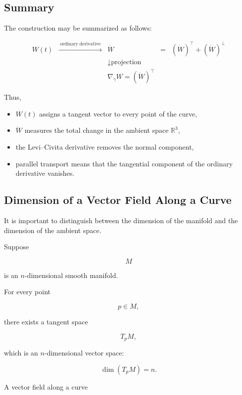 \documentclass[12pt,a4paper]{article}
\theoremstyle{notespace}
\begin{document}

\subsection{Summary}

The construction may be summarized as follows:

\[
\boxed{
	\begin{array}{ccccc}
		W(t)
		&\xrightarrow{\;\text{ordinary derivative}\;}
		&
		\dot W
		&=&
		(\dot W)^{\top}
		+
		(\dot W)^{\perp}
		\\[2mm]
		&&
		\downarrow
		\text{projection}
		&&
		\\[2mm]
		&&
		\nabla_{\dot\gamma}W
		=
		(\dot W)^{\top}
		&&
	\end{array}
}
\]

Thus,

\begin{itemize}
	\item \(W(t)\) assigns a tangent vector to every point of the curve,
	\item \(\dot W\) measures the total change in the ambient space
	\(\mathbb R^3\),
	\item the Levi--Civita derivative removes the normal component,
	\item parallel transport means that the tangential component of the
	ordinary derivative vanishes.
\end{itemize}

\subsection{Dimension of a Vector Field Along a Curve}

It is important to distinguish between the dimension of the manifold and
the dimension of the ambient space.

Suppose

\[
M
\]

is an \(n\)-dimensional smooth manifold.

For every point

\[
p\in M,
\]

there exists a tangent space

\[
\boxed{
	T_pM,
}
\]

which is an \(n\)-dimensional vector space:

\[
\boxed{
	\dim(T_pM)=n.
}
\]

A vector field along a curve
\end{document}
